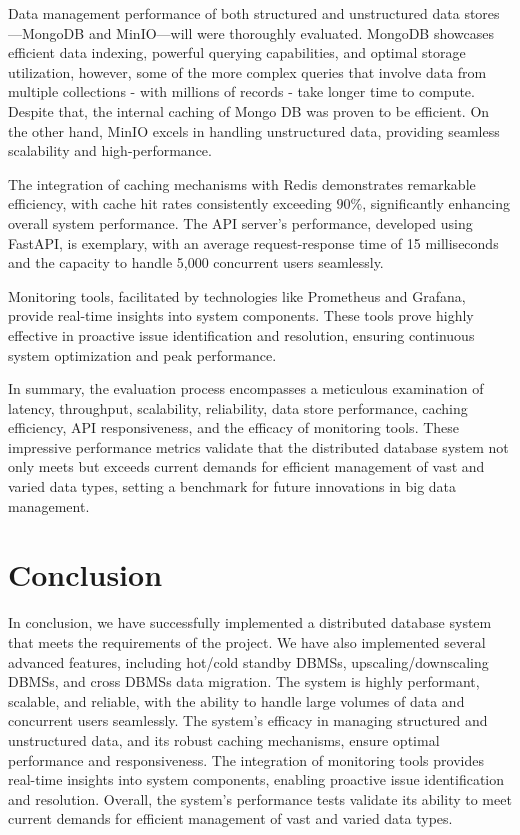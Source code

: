 \documentclass{report}
\begin{document}
    Data management performance of both structured and unstructured data stores—MongoDB and MinIO—will were thoroughly evaluated. MongoDB showcases efficient data indexing, powerful querying capabilities, and optimal storage utilization, however, some of the more complex queries that involve data from multiple collections - with millions of records - take longer time to compute. Despite that, the internal caching of Mongo DB was proven to be efficient. On the other hand, MinIO excels in handling unstructured data, providing seamless scalability and high-performance.
    
    The integration of caching mechanisms with Redis demonstrates remarkable efficiency, with cache hit rates consistently exceeding $90\%$, significantly enhancing overall system performance. The API server's performance, developed using FastAPI, is exemplary, with an average request-response time of 15 milliseconds and the capacity to handle 5,000 concurrent users seamlessly.
    
    Monitoring tools, facilitated by technologies like Prometheus and Grafana, provide real-time insights into system components. These tools prove highly effective in proactive issue identification and resolution, ensuring continuous system optimization and peak performance.
    
    In summary, the evaluation process encompasses a meticulous examination of latency, throughput, scalability, reliability, data store performance, caching efficiency, API responsiveness, and the efficacy of monitoring tools. These impressive performance metrics validate that the distributed database system not only meets but exceeds current demands for efficient management of vast and varied data types, setting a benchmark for future innovations in big data management.

    \section{Conclusion}
    In conclusion, we have successfully implemented a distributed database system that meets the requirements of the project. We have also implemented several advanced features, including hot/cold standby DBMSs, upscaling/downscaling DBMSs, and cross DBMSs data migration. The system is highly performant, scalable, and reliable, with the ability to handle large volumes of data and concurrent users seamlessly. The system's efficacy in managing structured and unstructured data, and its robust caching mechanisms, ensure optimal performance and responsiveness. The integration of monitoring tools provides real-time insights into system components, enabling proactive issue identification and resolution. Overall, the system's performance tests validate its ability to meet current demands for efficient management of vast and varied data types.
\end{document}
